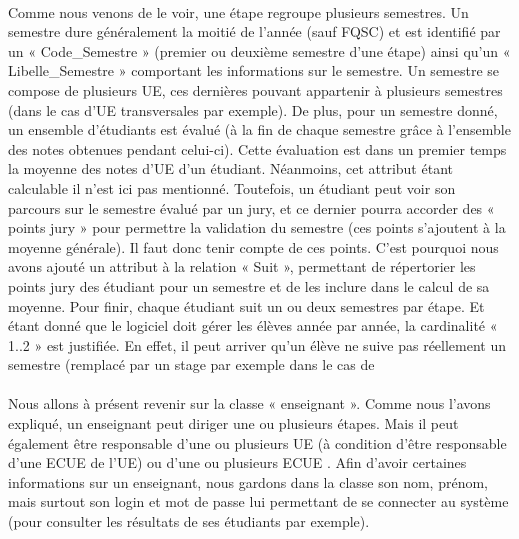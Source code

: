 \documentclass[letter, 11pt] {article}
\begin{document}
	\paragraph{ }Comme nous venons de le voir, une étape regroupe plusieurs semestres. Un semestre dure généralement la moitié de l'année (sauf FQSC) et est identifié par un « Code\_Semestre » (premier ou deuxième semestre d'une étape) ainsi qu'un « Libelle\_Semestre » comportant les informations sur le semestre. Un semestre se compose de plusieurs UE, ces dernières pouvant appartenir à plusieurs semestres (dans le cas d'UE transversales par exemple). De plus, pour un semestre donné, un ensemble d'étudiants est évalué (à la fin de chaque semestre grâce à l'ensemble des notes obtenues pendant celui-ci). Cette évaluation est dans un premier temps la moyenne des notes d'UE d'un étudiant. Néanmoins, cet attribut étant calculable il n'est ici pas mentionné. Toutefois, un étudiant peut voir son parcours sur le semestre évalué par un jury, et ce  dernier pourra accorder des  « points jury » pour permettre la validation du semestre (ces points s'ajoutent à la moyenne générale). Il faut donc tenir compte de ces points. C’est pourquoi nous avons ajouté un attribut à la relation « Suit », permettant de répertorier les points jury des étudiant pour un semestre et de les inclure dans le calcul de sa moyenne. Pour finir, chaque étudiant suit un ou deux semestres par étape. Et étant donné que le logiciel doit gérer les élèves année par année, la cardinalité « 1..2 » est justifiée. En effet, il peut arriver qu’un élève ne suive pas réellement un semestre (remplacé par un stage par exemple dans le cas de 

	\paragraph{ }Nous allons à présent revenir sur la classe « enseignant ».  Comme nous l'avons expliqué, un enseignant peut diriger une ou plusieurs étapes. Mais il peut également être responsable d'une ou plusieurs UE (à condition d'être responsable d’une ECUE de l'UE) ou d’une ou plusieurs ECUE . Afin d'avoir certaines informations sur un enseignant, nous gardons dans la classe son nom, prénom, mais surtout son login et mot de passe lui permettant de se connecter au système (pour consulter les résultats de ses étudiants par exemple).
\end{document}
